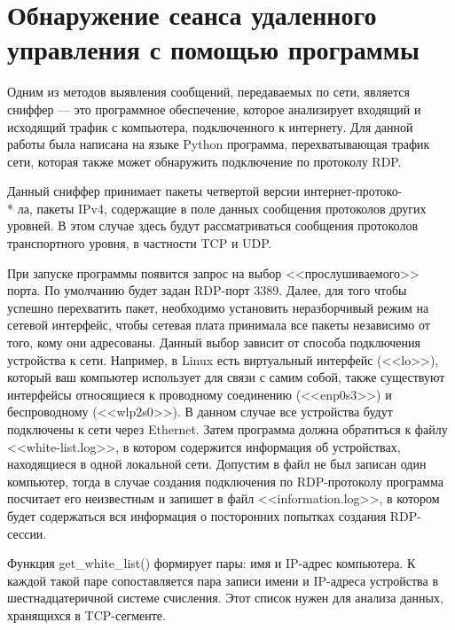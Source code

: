 \documentclass[bachelor, och, coursework]{SCWorks}
\begin{document}
    
  \section{Обнаружение сеанса удаленного управления с помощью программы}
  
  Одним из методов выявления сообщений, передаваемых по сети, является сниффер --- это программное обеспечение, которое анализирует входящий и исходящий трафик с компьютера, подключенного к
  интернету. Для данной работы была написана на языке Python программа, перехватывающая трафик сети, которая также может обнаружить подключение по
  протоколу RDP.
    
  Данный сниффер принимает пакеты четвертой версии интернет-протоко- \\* ла, пакеты IPv4, содержащие в поле данных сообщения протоколов других уровней. В
  этом случае здесь будут рассматриваться сообщения протоколов транспортного уровня, в частности TCP и UDP.
    
  При запуске программы появится запрос на выбор <<прослушиваемого>> порта. По умолчанию будет задан RDP-порт 3389. Далее, для того чтобы успешно
  перехватить пакет, необходимо установить неразборчивый режим на сетевой интерфейс, чтобы сетевая плата принимала все пакеты независимо от того,
  кому они адресованы. Данный выбор
  зависит от способа подключения устройства к сети. Например, в Linux есть виртуальный интерфейс (<<lo>>), который ваш компьютер использует для связи с
  самим собой, также существуют интерфейсы относящиеся к проводному соединению (<<enp0s3>>) и беспроводному (<<wlp2s0>>). В данном случае все устройства
  будут подключены к сети через Ethernet. Затем программа должна обратиться к файлу <<white-list.log>>, в котором содержится информация об устройствах,
  находящиеся в одной локальной сети. Допустим в файл не был записан один компьютер, тогда в случае создания подключения по RDP-протоколу программа посчитает его
  неизвестным и запишет в файл <<information.log>>, в котором будет содержаться вся информация о посторонних попытках создания RDP-сессии.

    Функция get\_white\_list() формирует пары: имя и IP-адрес компьютера. К каждой такой паре сопоставляется пара записи имени и IP-адреса устройства в
    шестнадцатеричной системе счисления. Этот список нужен для анализа данных, хранящихся в TCP-сегменте.
\end{document}
